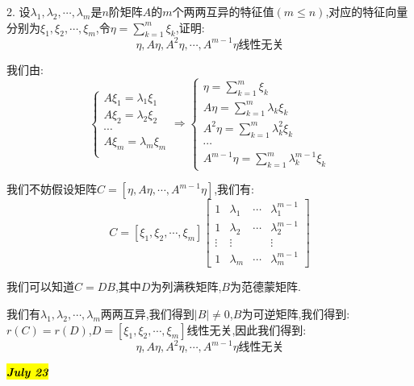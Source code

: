2. 设$\lambda_{1},\lambda_{2},\cdots,\lambda_{m}$是$n$阶矩阵$A$的$m$个两两互异的特征值$(m\leq n)$,对应的特征向量分别为$\xi_{1},\xi_{2},\cdots,\xi_{m}$,令$\eta=\sum\limits_{k=1}^{m}\xi_{k}$,证明: $$\eta,A\eta,A^2\eta,\cdots,A^{m-1}\eta\text{线性无关}$$
\begin{solution}
	
	我们由: 
	$$\left\lbrace
	\begin{array}{l}
		A\xi_{1}=\lambda_{1}\xi_{1}\\
		A\xi_{2}=\lambda_{2}\xi_{2}\\
		\cdots\\
		A\xi_{m}=\lambda_{m}\xi_{m}\\
	\end{array}
	\right. \Rightarrow \left\lbrace
	\begin{array}{l}
		\eta=\sum\limits_{k=1}^{m}\xi_{k}\\
		A\eta=\sum\limits_{k=1}^{m}\lambda_{k}\xi_{k}\\
		A^2\eta=\sum\limits_{k=1}^{m}\lambda_{k}^{2}\xi_{k}\\
		\cdots\\
		A^{m-1}\eta=\sum\limits_{k=1}^{m}\lambda_{k}^{m-1}\xi_{k}
	\end{array}
	\right. $$
	
	我们不妨假设矩阵$C=[\eta,A\eta,\cdots,A^{m-1}\eta]$,我们有: 
	$$C=[\xi_{1},\xi_{2},\cdots,\xi_{m}]\left[ \begin{matrix}
		1&\lambda_{1}&\cdots&\lambda_{1}^{m-1}\\
		1&\lambda_{2}&\cdots&\lambda_{2}^{m-1}\\
		\vdots&\vdots& &\vdots\\
		1&\lambda_{m}&\cdots&\lambda_{m}^{m-1}
	\end{matrix}\right] $$
	
	我们可以知道$C=DB$,其中$D$为列满秩矩阵,$B$为范德蒙矩阵.
	
	我们有$\lambda_{1},\lambda_{2},\cdots,\lambda_{m}$两两互异,我们得到$|B|\neq 0$,$B$为可逆矩阵,我们得到: $r(C)=r(D)$,$D=[\xi_{1},\xi_{2},\cdots,\xi_{m}]$线性无关,因此我们得到: 
	$$\eta,A\eta,A^2\eta,\cdots,A^{m-1}\eta\text{线性无关}$$
\end{solution}

\hl{\textbf{\textit{July 23}}}

